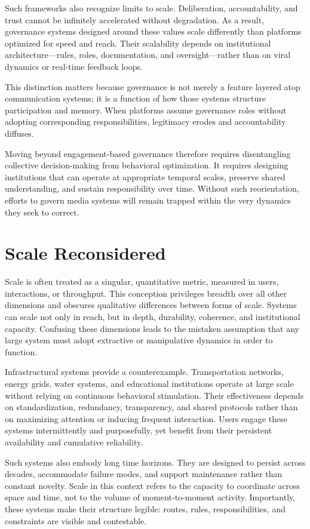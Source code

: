 \documentclass[12pt]{article}
\begin{document}
Such frameworks also recognize limits to scale. Deliberation, accountability, and trust cannot be infinitely accelerated without degradation. As a result, governance systems designed around these values scale differently than platforms optimized for speed and reach. Their scalability depends on institutional architecture—rules, roles, documentation, and oversight—rather than on viral dynamics or real-time feedback loops.

This distinction matters because governance is not merely a feature layered atop communication systems; it is a function of how those systems structure participation and memory. When platforms assume governance roles without adopting corresponding responsibilities, legitimacy erodes and accountability diffuses.

Moving beyond engagement-based governance therefore requires disentangling collective decision-making from behavioral optimization. It requires designing institutions that can operate at appropriate temporal scales, preserve shared understanding, and sustain responsibility over time. Without such reorientation, efforts to govern media systems will remain trapped within the very dynamics they seek to correct.

\section{Scale Reconsidered}

Scale is often treated as a singular, quantitative metric, measured in users, interactions, or throughput. This conception privileges breadth over all other dimensions and obscures qualitative differences between forms of scale. Systems can scale not only in reach, but in depth, durability, coherence, and institutional capacity. Confusing these dimensions leads to the mistaken assumption that any large system must adopt extractive or manipulative dynamics in order to function.

Infrastructural systems provide a counterexample. Transportation networks, energy grids, water systems, and educational institutions operate at large scale without relying on continuous behavioral stimulation. Their effectiveness depends on standardization, redundancy, transparency, and shared protocols rather than on maximizing attention or inducing frequent interaction. Users engage these systems intermittently and purposefully, yet benefit from their persistent availability and cumulative reliability.

Such systems also embody long time horizons. They are designed to persist across decades, accommodate failure modes, and support maintenance rather than constant novelty. Scale in this context refers to the capacity to coordinate across space and time, not to the volume of moment-to-moment activity. Importantly, these systems make their structure legible: routes, rules, responsibilities, and constraints are visible and contestable.
\end{document}
